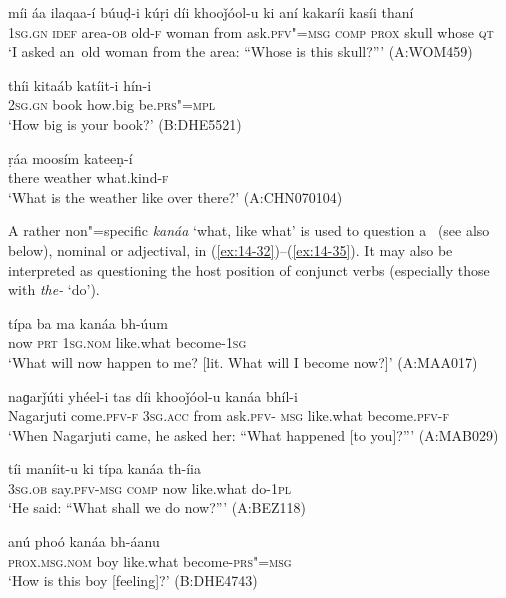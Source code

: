 \begin{exe}
\ex
\label{ex:14-29}
\gll míi áa ilaqaa-í búuḍ-i kúṛi díi khooǰóol-u  ki aní kakaríi kasíi thaní \\
\textsc{1sg.gn} \textsc{idef} area-\textsc{ob} old-\textsc{f} woman from ask.\textsc{pfv"=msg} \textsc{comp} \textsc{prox} skull whose \textsc{qt} \\
\glt `I asked an~old woman from the area: ``Whose is this skull?''' (A:WOM459)

\ex
\label{ex:14-30}
\gll thíi kitaáb katíit-i hín-i \\
\textsc{2sg.gn} book how.big be.\textsc{prs"=mpl} \\
\glt `How big is your book?' (B:DHE5521)

\ex
\label{ex:14-31}
\gll ṛáa moosím kateeṇ-í \\
there weather what.kind-\textsc{f} \\
\glt `What is the weather like over there?' (A:CHN070104)
\end{exe}

A rather non"=specific \textit{kanáa} `what, like what' is used to question a~  (see also below), nominal or adjectival, in (\ref{ex:14-32})--(\ref{ex:14-35}). It may also be interpreted as questioning the host position of conjunct verbs (especially those with \textit{the-} `do'). 

\begin{exe}
\ex
\label{ex:14-32}
\gll típa ba ma kanáa bh-úum \\
now \textsc{prt} \textsc{1sg.nom} like.what become-\textsc{1sg} \\
\glt `What will now happen to me? [lit. What will I become now?]' (A:MAA017)

\ex
\label{ex:14-33}
\gll naɡarǰúti yhéel-i tas díi khooǰóol-u kanáa bhíl-i \\
Nagarjuti come.\textsc{pfv-f} \textsc{3sg.acc} from ask.\textsc{pfv- msg}  like.what become.\textsc{pfv-f} \\
\glt `When Nagarjuti came, he asked her: ``What happened [to you]?''' (A:MAB029)

\ex
\label{ex:14-34}
\gll tíi maníit-u ki típa kanáa th-íia \\
\textsc{3sg.ob} say.\textsc{pfv-msg} \textsc{comp} now like.what do-\textsc{1pl} \\
\glt `He said: ``What shall we do now?''' (A:BEZ118)

\ex
\label{ex:14-35}
\gll anú phoó kanáa bh-áanu \\
\textsc{prox.msg.nom} boy like.what become-\textsc{prs"=msg} \\
\glt `How is this boy [feeling]?' (B:DHE4743)
\end{exe}

